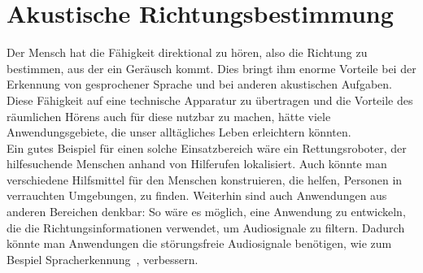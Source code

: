 \section{Akustische Richtungsbestimmung}
Der Mensch hat die Fähigkeit direktional zu hören, also die Richtung zu bestimmen, aus der ein Geräusch kommt. Dies bringt ihm enorme Vorteile bei der Erkennung von gesprochener Sprache und bei anderen akustischen Aufgaben. Diese Fähigkeit auf eine technische Apparatur zu übertragen und die Vorteile des räumlichen Hörens auch für diese nutzbar zu machen, hätte viele Anwendungsgebiete, die unser alltägliches Leben erleichtern könnten.\\
Ein gutes Beispiel für einen solche Einsatzbereich wäre ein Rettungsroboter, der hilfesuchende Menschen anhand von Hilferufen lokalisiert. Auch könnte man verschiedene Hilfsmittel für den Menschen konstruieren, die helfen, Personen in verrauchten Umgebungen, zu finden.
Weiterhin sind auch Anwendungen aus anderen Bereichen denkbar: So wäre es möglich, eine Anwendung zu entwickeln, die die Richtungsinformationen verwendet, um Audiosignale zu filtern. Dadurch könnte man Anwendungen die störungsfreie Audiosignale benötigen, wie zum Bespiel Spracherkennung~\cite{Spracherkennung}, verbessern.